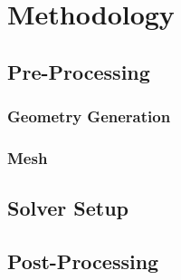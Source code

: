 \section{Methodology}

\subsection{Pre-Processing}
\subsubsection{Geometry Generation}
\subsubsection{Mesh}

\subsection{Solver Setup}

\subsection{Post-Processing}

